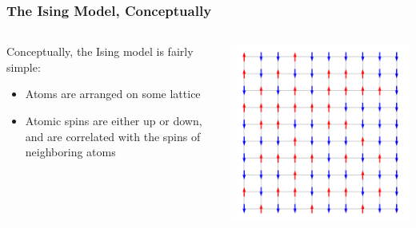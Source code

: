 \documentclass[aspectratio=169, 12pt]{beamer}
\begin{document}
\begin{frame}
    \frametitle{The Ising Model, Conceptually}

    \begin{columns}
        \begin{column}{.6\textwidth}
            
            Conceptually, the Ising model is fairly simple:
            \begin{itemize}
                \item Atoms are arranged on some lattice
                \item Atomic spins are either up or down, and are correlated with the spins of neighboring atoms
            \end{itemize}
            
        \end{column}
        \begin{column}{.4\textwidth}
            \includegraphics[width=\textwidth]{images/ising-spins-grid.png}
        \end{column}
    \end{columns}
\end{frame}
\end{document}
